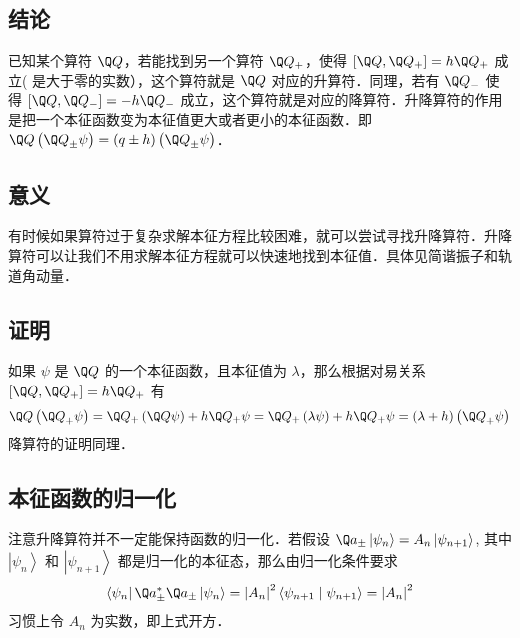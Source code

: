 

\subsection{结论}

已知某个算符 $\Q Q$，若能找到另一个算符 ${\Q Q_ + }$，使得 $[\Q Q,{\Q Q_ + }] = h{\Q Q_ + }$ 成立( 是大于零的实数），这个算符就是 $\Q Q$ 对应的升算符．同理，若有 ${\Q Q_- }$ 使得 $[\Q Q,{\Q Q_ - }] =  - h{\Q Q_ - }$ 成立，这个算符就是对应的降算符．升降算符的作用是把一个本征函数变为本征值更大或者更小的本征函数．即 $\Q Q\left( {{{\Q Q}_ \pm }\psi } \right) = \left( {q \pm h} \right)\left( {{{\Q Q}_ \pm }\psi } \right)$．

\subsection{意义}
有时候如果算符过于复杂求解本征方程比较困难，就可以尝试寻找升降算符．升降算符可以让我们不用求解本征方程就可以快速地找到本征值．具体见简谐振子和轨道角动量．%

\subsection{证明}
如果 $\psi$ 是 $\Q Q$ 的一个本征函数，且本征值为 $\lambda$，那么根据对易关系 $[\Q Q,{\Q Q_ + }] = h{\Q Q_ + }$ 有
\begin{equation}
\Q Q\left( {{{\Q Q}_ + }\psi } \right) = {\Q Q_ + }\left( {\Q Q\psi } \right) + h{\Q Q_ + }\psi  = {\Q Q_ + }\left( {\lambda \psi } \right) + h{\Q Q_ + }\psi  = \left( {\lambda  + h} \right)\left( {{{\Q Q}_ + }\psi } \right)
\end{equation}
降算符的证明同理．

\subsection{本征函数的归一化}
注意升降算符并不一定能保持函数的归一化．若假设 ${\Q a_ \pm }\left| {\psi_n} \right\rangle  = {A_n}\left| {\psi_{n + 1}} \right\rangle$, 其中 $\left| {\psi_n} \right\rangle$ 和 $\left| {\psi_{n + 1}} \right\rangle$ 都是归一化的本征态，那么由归一化条件要求
\begin{equation}
\left\langle {\psi_n} \right|\Q a_ \pm ^ * {\Q a_ \pm }\left| {\psi_n} \right\rangle  = {\left| {A_n} \right|^2}\left\langle {\psi_{n + 1}}
 \mathrel{\left | {\vphantom {{\psi_{n + 1}} {\psi_{n + 1}}}}
 \right. \kern-\nulldelimiterspace}
 {\psi_{n + 1}} \right\rangle  = {\left| {A_n} \right|^2}
\end{equation}
习惯上令 $A_n$ 为实数，即上式开方． 

